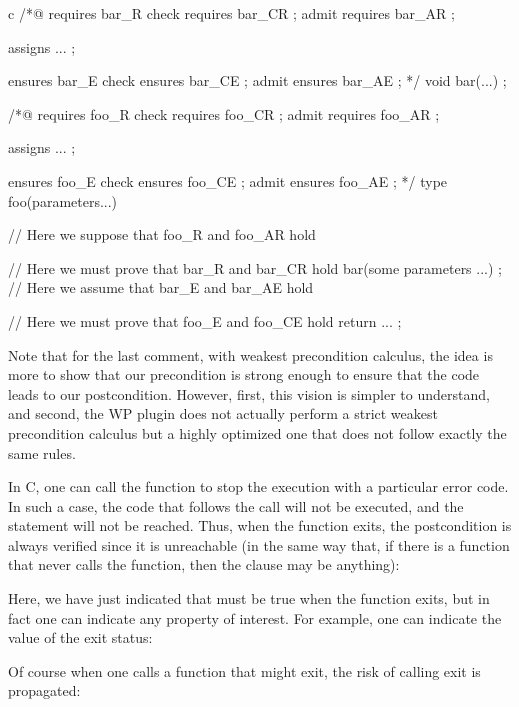 \begin{CodeBlock}{c}
/*@       requires bar_R
    check requires bar_CR ;
    admit requires bar_AR ;

    assigns ... ;

          ensures bar_E
    check ensures bar_CE ;
    admit ensures bar_AE ;
*/
void bar(...) ;

/*@       requires foo_R
    check requires foo_CR ;
    admit requires foo_AR ;

    assigns ... ;

          ensures foo_E
    check ensures foo_CE ;
    admit ensures foo_AE ;
*/
type foo(parameters...){
  // Here we suppose that foo_R and foo_AR hold


  // Here we must prove that bar_R and bar_CR hold
  bar(some parameters ...) ;
  // Here we assume that bar_E and bar_AE hold


  // Here we must prove that foo_E and foo_CE hold
  return ... ;
}
\end{CodeBlock}


Note that for the last comment, with weakest precondition calculus, the idea
is more to show that our precondition is strong enough to ensure that the code
leads to our postcondition. However, first, this vision is simpler to
understand, and second, the WP plugin does not actually perform a strict weakest
precondition calculus but a highly optimized one that does not follow exactly
the same rules.




In C, one can call the  function to stop the execution with a
particular error code. In such a case, the code that follows the call will not
be executed, and the  statement will not be reached. Thus,
when the function exits, the postcondition is always verified since it is
unreachable (in the same way that, if there is a function that never calls
the  function, then the  clause may be anything):




Here, we have just indicated that  must be true
when the function exits, but in fact one can indicate any property of interest.
For example, one can indicate the value of the exit status:




Of course when one calls a function that might exit, the risk of
calling exit is propagated:


